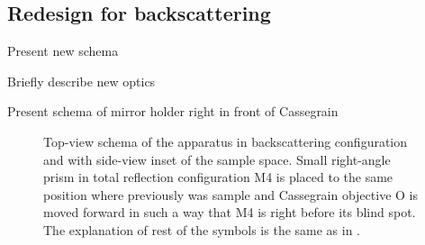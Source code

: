 \subsection{Redesign for backscattering}
\begin{docitemize}
	\item Present new schema
	\item Briefly describe new optics
	\item Present schema of mirror holder right in front of Cassegrain
\end{docitemize}

\begin{figure}
	\centering
	
	\caption{Top-view schema of the apparatus in backscattering configuration
		and with side-view inset of the sample space. Small right-angle prism in
		total reflection configuration M4 is placed to the same position where
		previously was sample and Cassegrain objective O is moved forward in such
		a way that M4 is right before its blind spot. The explanation of rest of
		the symbols is the same as in
		.}
	\label{\figlabel{backscattering:apparatus_schema}}
\end{figure}
